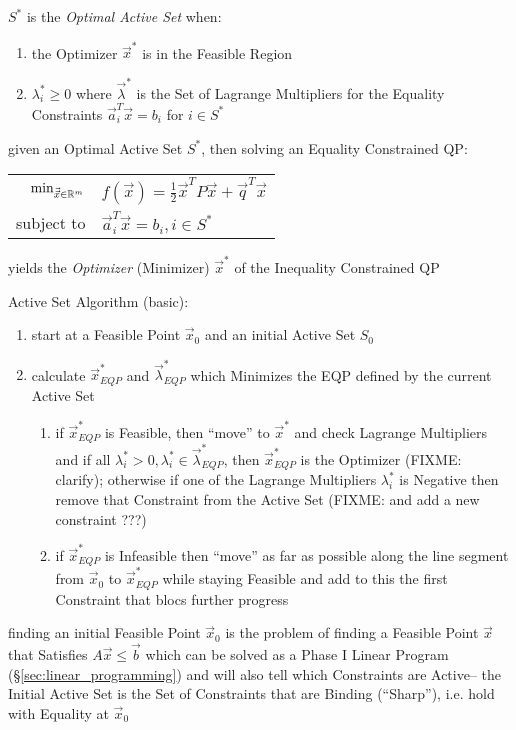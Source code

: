 $S^*$ is the \emph{Optimal Active Set} when:
\begin{enumerate}
  \item the Optimizer $\vec{x}^*$ is in the Feasible Region
  \item $\lambda^*_i \geq 0$ where $\vec{\lambda}^*$ is the Set of Lagrange
    Multipliers for the Equality Constraints $\vec{a}_i^T\vec{x} = b_i$ for $i
    \in S^*$
\end{enumerate}

given an Optimal Active Set $S^*$, then solving an Equality Constrained QP:

\begin{tabular}{r l}
  $\mathrm{min}_{\vec{\vec{x}} \in \mathbb{R}^m}$ &
    $f(\vec{x}) = \frac{1}{2}\vec{x}^T P\vec{x} + \vec{q}^T\vec{x}$ \\
  subject to & $\vec{a}_i^T\vec{x} = b_i, i \in S^*$ \\
\end{tabular}

yields the \emph{Optimizer} (Minimizer) $\vec{x}^*$ of the Inequality
Constrained QP

Active Set Algorithm (basic):
\begin{enumerate}
  \item start at a Feasible Point $\vec{x}_0$ and an initial Active Set $S_0$
  \item calculate $\vec{x}^*_{EQP}$ and $\vec{\lambda}^*_{EQP}$ which Minimizes
    the EQP defined by the current Active Set
    \begin{enumerate}
      \item if $\vec{x}^*_{EQP}$ is Feasible, then ``move'' to $\vec{x}^*$ and
        check Lagrange Multipliers and if all $\lambda^*_i > 0, \lambda^*_i \in
        \vec{\lambda}^*_{EQP}$, then $\vec{x}^*_{EQP}$ is the Optimizer (FIXME:
        clarify); otherwise if one of the Lagrange Multipliers $\lambda^*_i$ is
        Negative then remove that Constraint from the Active Set (FIXME: and
        add a new constraint ???)
      \item if $\vec{x}^*_{EQP}$ is Infeasible then ``move'' as far as possible
        along the line segment from $\vec{x}_0$ to $\vec{x}^*_{EQP}$ while
        staying Feasible and add to this the first Constraint that blocs
        further progress
    \end{enumerate}
\end{enumerate}

finding an initial Feasible Point $\vec{x}_0$ is the problem of finding a
Feasible Point $\vec{x}$ that Satisfies $A\vec{x} \leq \vec{b}$ which can be
solved as a Phase I Linear Program (\S\ref{sec:linear_programming}) and will
also tell which Constraints are Active-- the Initial Active Set is the Set of
Constraints that are Binding (``Sharp''), i.e. hold with Equality at
$\vec{x}_0$

